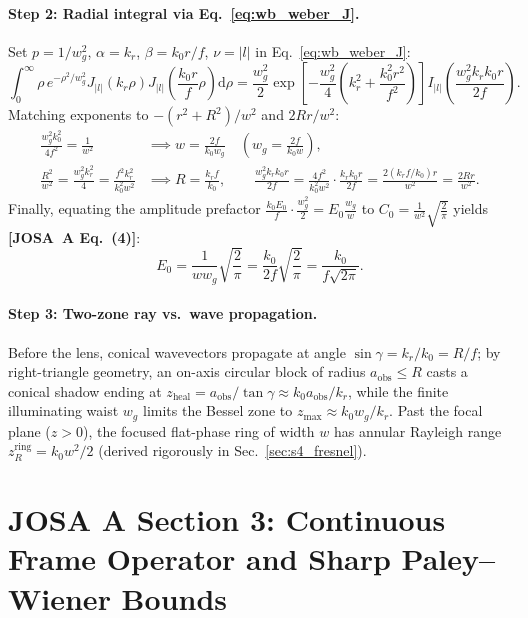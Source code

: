 \documentclass[10pt,letterpaper]{article}
\newcommand{\abs}[1]{\lvert #1 \rvert}
\newcommand{\dd}{\mathrm{d}}
\newcommand{\josa}[1]{\textbf{[JOSA~A Eq.~(#1)]}}
\numberwithin{equation}{section}
\begin{document}
\paragraph*{Step 2: Radial integral via Eq.~\eqref{eq:wb_weber_J}.}
Set $p = 1/w_g^2$, $\alpha = k_r$, $\beta = k_0 r/f$, $\nu = \abs{l}$ in Eq.~\eqref{eq:wb_weber_J}:
\begin{equation}
  \int_0^\infty \rho\,e^{-\rho^2/w_g^2} J_{\abs{l}}(k_r\rho) J_{\abs{l}}\!\left(\frac{k_0 r}{f}\rho\right)\dd\rho
  = \frac{w_g^2}{2}\exp\!\left[-\frac{w_g^2}{4}\left(k_r^2 + \frac{k_0^2 r^2}{f^2}\right)\right] I_{\abs{l}}\!\left(\frac{w_g^2 k_r k_0 r}{2f}\right).
\end{equation}
Matching exponents to $-(r^2+R^2)/w^2$ and $2Rr/w^2$:
\begin{align}
  \frac{w_g^2 k_0^2}{4f^2} = \frac{1}{w^2} &\implies w = \frac{2f}{k_0 w_g} \quad \left(w_g = \frac{2f}{k_0 w}\right), \\
  \frac{R^2}{w^2} = \frac{w_g^2 k_r^2}{4} = \frac{f^2 k_r^2}{k_0^2 w^2} &\implies R = \frac{k_r f}{k_0}, \qquad \frac{w_g^2 k_r k_0 r}{2f} = \frac{4f^2}{k_0^2 w^2}\cdot\frac{k_r k_0 r}{2f} = \frac{2(k_r f/k_0)r}{w^2} = \frac{2Rr}{w^2}.
\end{align}
Finally, equating the amplitude prefactor $\frac{k_0 E_0}{f}\cdot\frac{w_g^2}{2} = E_0 \frac{w_g}{w}$ to $C_0 = \frac{1}{w^2}\sqrt{\frac{2}{\pi}}$ yields \josa{4}:
\begin{equation}
  E_0 = \frac{1}{w w_g}\sqrt{\frac{2}{\pi}} = \frac{k_0}{2f}\sqrt{\frac{2}{\pi}} = \frac{k_0}{f\sqrt{2\pi}}.
\end{equation}
\paragraph*{Step 3: Two-zone ray vs.\ wave propagation.}
Before the lens, conical wavevectors propagate at angle $\sin\gamma = k_r/k_0 = R/f$; by right-triangle geometry, an on-axis circular block of radius $a_{\mathrm{obs}} \le R$ casts a conical shadow ending at $z_{\mathrm{heal}} = a_{\mathrm{obs}}/\tan\gamma \approx k_0 a_{\mathrm{obs}}/k_r$, while the finite illuminating waist $w_g$ limits the Bessel zone to $z_{\max} \approx k_0 w_g/k_r$. Past the focal plane ($z > 0$), the focused flat-phase ring of width $w$ has annular Rayleigh range $z_R^{\mathrm{ring}} = k_0 w^2/2$ (derived rigorously in Sec.~\ref{sec:s4_fresnel}).

\section{JOSA A Section 3: Continuous Frame Operator and Sharp Paley--Wiener Bounds}
\label{sec:s3}
\end{document}
